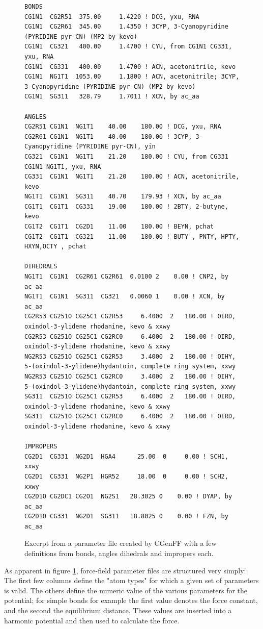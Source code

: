 \documentclass[oneside]{scrreprt}
\begin{document}
\begin{figure}
\tiny
\begin{verbatim}
BONDS
CG1N1  CG2R51  375.00     1.4220 ! DCG, yxu, RNA
CG1N1  CG2R61  345.00     1.4350 ! 3CYP, 3-Cyanopyridine (PYRIDINE pyr-CN) (MP2 by kevo)
CG1N1  CG321   400.00     1.4700 ! CYU, from CG1N1 CG331, yxu, RNA
CG1N1  CG331   400.00     1.4700 ! ACN, acetonitrile, kevo
CG1N1  NG1T1  1053.00     1.1800 ! ACN, acetonitrile; 3CYP, 3-Cyanopyridine (PYRIDINE pyr-CN) (MP2 by kevo)
CG1N1  SG311   328.79     1.7011 ! XCN, by ac_aa            

ANGLES
CG2R51 CG1N1  NG1T1    40.00    180.00 ! DCG, yxu, RNA
CG2R61 CG1N1  NG1T1    40.00    180.00 ! 3CYP, 3-Cyanopyridine (PYRIDINE pyr-CN), yin
CG321  CG1N1  NG1T1    21.20    180.00 ! CYU, from CG331 CG1N1 NG1T1, yxu, RNA
CG331  CG1N1  NG1T1    21.20    180.00 ! ACN, acetonitrile, kevo
NG1T1  CG1N1  SG311    40.70    179.93 ! XCN, by ac_aa                
CG1T1  CG1T1  CG331    19.00    180.00 ! 2BTY, 2-butyne, kevo
CG1T2  CG1T1  CG2D1    11.00    180.00 ! BEYN, pchat
CG1T2  CG1T1  CG321    11.00    180.00 ! BUTY , PNTY, HPTY, HXYN,OCTY , pchat

DIHEDRALS
NG1T1  CG1N1  CG2R61 CG2R61  0.0100 2    0.00 ! CNP2, by ac_aa
NG1T1  CG1N1  SG311  CG321   0.0060 1    0.00 ! XCN, by ac_aa
CG2R53 CG251O CG25C1 CG2R53     6.4000  2   180.00 ! OIRD, oxindol-3-ylidene rhodanine, kevo & xxwy
CG2R53 CG251O CG25C1 CG2RC0     6.4000  2   180.00 ! OIRD, oxindol-3-ylidene rhodanine, kevo & xxwy
NG2R53 CG251O CG25C1 CG2R53     3.4000  2   180.00 ! OIHY, 5-(oxindol-3-ylidene)hydantoin, complete ring system, xxwy
NG2R53 CG251O CG25C1 CG2RC0     3.4000  2   180.00 ! OIHY, 5-(oxindol-3-ylidene)hydantoin, complete ring system, xxwy
SG311  CG251O CG25C1 CG2R53     6.4000  2   180.00 ! OIRD, oxindol-3-ylidene rhodanine, kevo & xxwy
SG311  CG251O CG25C1 CG2RC0     6.4000  2   180.00 ! OIRD, oxindol-3-ylidene rhodanine, kevo & xxwy

IMPROPERS
CG2D1  CG331  NG2D1  HGA4      25.00  0     0.00 ! SCH1, xxwy
CG2D1  CG331  NG2P1  HGR52     18.00  0     0.00 ! SCH2, xxwy
CG2D1O CG2DC1 CG2O1  NG2S1   28.3025 0    0.00 ! DYAP, by ac_aa              
CG2D1O CG331  NG2D1  SG311   18.8025 0    0.00 ! FZN, by ac_aa
\end{verbatim}
   \caption{Excerpt from a parameter file created by CGenFF with a few definitions from bonds, angles dihedrals and impropers each.}
    \label{fig:parmfile}
\end{figure}

As apparent in figure \ref{fig:parmfile}, force-field parameter files are structured very simply: The first few columns define the "atom types" for which a given set of parameters is valid. The others define the numeric value of the various parameters for the potential; for simple bonds for example the first value denotes the force constant, and the second the equilibrium distance. These values are inserted into a harmonic potential and then used to calculate the force. 
\end{document}
